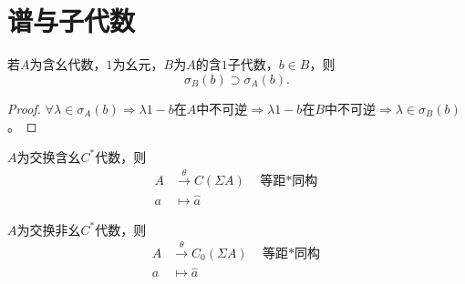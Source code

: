 \documentclass[lang=cn,a4paper,newtx,section]{elegantbook}
\begin{document}
\section{谱与子代数}

\begin{proposition}
  若$A$为含幺代数，$1$为幺元，$B$为$A$的含$1$子代数，$b \in B$，则
  \begin{equation*}
    \sigma_B(b) \supset \sigma_A(b).
  \end{equation*}
\end{proposition}

\begin{proof}
  $\forall \lambda \in \sigma_A(b) \Rightarrow \lambda 1 - b$在$A$中不可逆$\Rightarrow \lambda 1 - b$在$B$中不可逆$\Rightarrow \lambda \in \sigma_B(b)$。
\end{proof}

\begin{theorem}
  $A$为交换含幺$C^*$代数，则
  \begin{equation*}
    \begin{aligned}
      A &\xrightarrow{\theta} C(\Sigma A) \quad \text{等距$*$同构} \\
      a &\longmapsto \hat{a}
    \end{aligned}
  \end{equation*}
\end{theorem}

\begin{theorem}
  $A$为交换非幺$C^*$代数，则
  \begin{equation*}
    \begin{aligned}
      A &\xrightarrow{\theta} C_0(\Sigma A) \quad \text{等距$*$同构} \\
      a &\longmapsto \hat{a}
    \end{aligned}
  \end{equation*}
\end{theorem}
\end{document}
